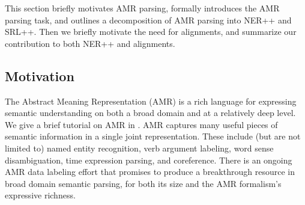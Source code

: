 \documentclass[11pt]{article}
\begin{document}

This section briefly motivates AMR parsing, formally introduces the AMR parsing task, and outlines a decomposition of AMR parsing into NER++ and SRL++. Then we briefly motivate the need for alignments, and summarize our contribution to both NER++ and alignments.

\subsection{Motivation}

The Abstract Meaning Representation (AMR) \cite{Banarescu:13} is a rich language for expressing semantic understanding on both a broad domain and at a relatively deep level. We give a brief tutorial on AMR in . AMR captures many useful pieces of semantic information in a single joint representation. These include (but are not limited to) named entity recognition, verb argument labeling, word sense disambiguation, time expression parsing, and coreference. There is an ongoing AMR data labeling effort that promises to produce a breakthrough resource in broad domain semantic parsing, for both its size and the AMR formalism's expressive richness.




\end{document}
